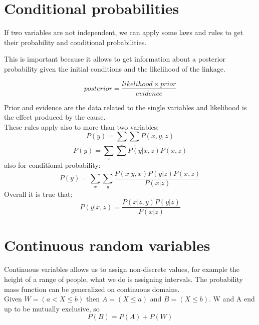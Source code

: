 \section{Conditional probabilities}
    If two variables are not independent, we can apply some laws and rules to get their probability and conditional probabilities.
    
    
    
    This is important because it allows to get information about a posterior probability given the initial conditions and the likelihood of the linkage.
    
    $$posterior = \frac{likelihood \times prior}{evidence}$$
    
    Prior and evidence are the data related to the single variables and likelihood is the effect produced by the cause.\\
    These rules apply also to more than two variables:
    $$P(y) = \sum_x \sum_z P(x, y, z)$$
    $$P(y) = \sum_x \sum_z P(y | x, z) P(x, z)$$
    also for conditional probability:
    $$P(y) = \sum_x \sum_y \frac{P(x|y, x)P(y|z)P(x, z)}{P(x|z)}$$
    Overall it is true that:
    $$P(y|x, z) = \frac{P(x|z, y)P(y|z)}{P(x|z)}$$
    
\section{Continuous random variables}
    Continuous variables allows us to assign non-discrete values, for example the height of a range of people, what we do is assigning intervals. 
    The probability mass function can be generalized on continuous domains.\\
    Given $W = (a < X \leq b)$ then $A = (X \leq a)$ and $B = (X \leq b)$. W and A end up to be mutually exclusive, so 
    $$P(B) = P(A) + P(W)$$
    
    

